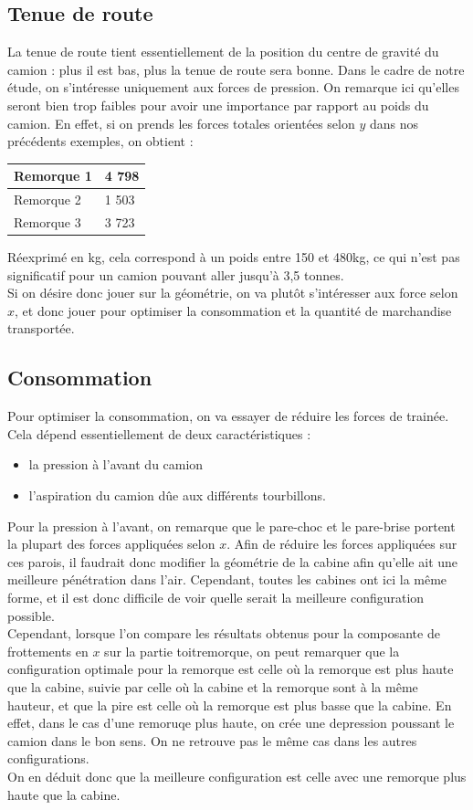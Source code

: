 \subsection{Tenue de route}
La tenue de route tient essentiellement de la position du centre de gravité du camion : plus il est bas, plus la tenue de route sera bonne. Dans le cadre de notre étude, on s'intéresse uniquement aux forces de pression. On remarque ici qu'elles seront bien trop faibles pour avoir une importance par rapport au poids du camion. En effet, si on prends les forces totales orientées selon $y$ dans nos précédents exemples, on obtient :
\begin{center}\begin{tabular}{|l|l|}
\hline
Remorque 1 & 4 798\\
\hline
Remorque 2 & 1 503 \\
\hline
Remorque 3 & 3 723\\
\hline
\end{tabular}\end{center}

Réexprimé en kg, cela correspond à un poids entre 150 et 480kg, ce qui n'est pas significatif pour un camion pouvant aller jusqu'à 3,5 tonnes.\\
Si on désire donc jouer sur la géométrie, on va plutôt s'intéresser aux force selon $x$, et donc jouer pour optimiser la consommation et la quantité de marchandise transportée.


\subsection{Consommation}
Pour optimiser la consommation, on va essayer de réduire les forces de trainée. Cela dépend essentiellement de deux caractéristiques :
\begin{itemize}
	\item la pression à l'avant du camion
	\item l'aspiration du camion dûe aux différents tourbillons.
\end{itemize}

Pour la pression à l'avant, on remarque que le pare-choc et le pare-brise portent la plupart des forces appliquées selon $x$. Afin de réduire les forces appliquées sur ces parois, il faudrait donc modifier la géométrie de la cabine afin qu'elle ait une meilleure pénétration dans l'air. Cependant, toutes les cabines ont ici la même forme, et il est donc difficile de voir quelle serait la meilleure configuration possible.\\
Cependant, lorsque l'on compare les résultats obtenus pour la composante de frottements en $x$ sur la partie toitremorque, on peut remarquer que la configuration optimale pour la remorque est celle où la remorque est plus haute que la cabine, suivie par celle où la cabine et la remorque sont à la même hauteur, et que la pire est celle où la remorque est plus basse que la cabine. En effet, dans le cas d'une remoruqe plus haute, on crée une depression poussant le camion dans le bon sens. On ne retrouve pas le même cas dans les autres configurations.\\
On en déduit donc que la meilleure configuration est celle avec une remorque plus haute que la cabine.

